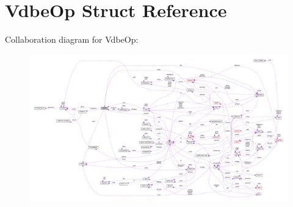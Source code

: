 \hypertarget{struct_vdbe_op}{\section{Vdbe\-Op Struct Reference}
\label{struct_vdbe_op}
}


Collaboration diagram for Vdbe\-Op\-:\nopagebreak
\begin{figure}[H]
\begin{center}
\leavevmode
\includegraphics[width=350pt]{struct_vdbe_op__coll__graph}
\end{center}
\end{figure}
